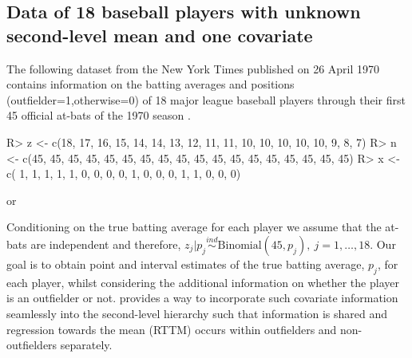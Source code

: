 \documentclass[article]{jss}
\begin{document}
\subsection[Unknown Second-level Mean and One Covariate]{Data of 18 baseball players with unknown second-level mean and one covariate} 

The following dataset from the New York Times published on 26 April 1970 contains information on the batting averages and positions (outfielder=1,otherwise=0) of 18 major league baseball players through their first 45 official at-bats of the 1970 season \citep{1975}.

\begin{CodeChunk}
\begin{CodeInput}
R> z <- c(18, 17, 16, 15, 14, 14, 13, 12, 11, 11, 10, 10, 10, 10, 10,  9,  8,  7)
R> n <- c(45, 45, 45, 45, 45, 45, 45, 45, 45, 45, 45, 45, 45, 45, 45, 45, 45, 45)
R> x <- c( 1,  1,  1,  1,  1,  0,  0,  0,  0,  1,  0,  0,  0,  1,  1,  0,  0,  0) 
\end{CodeInput}
\end{CodeChunk}
or
\begin{CodeChunk}
\end{CodeChunk}
Conditioning on the true batting average for each player we assume that the at-bats are independent and therefore, $z_{j}\vert p_{j} \textrm{Binomial}(45, p_{j}), ~j=1, \ldots, 18$. Our goal is to obtain point and interval estimates of the true batting average, $p_{j}$, for each player, whilst considering the additional information on whether the player is an outfielder or not.  provides a way to incorporate such covariate information seamlessly into the second-level hierarchy such that information is shared and regression towards the mean (RTTM) occurs within outfielders and non-outfielders separately. %
\end{document}
